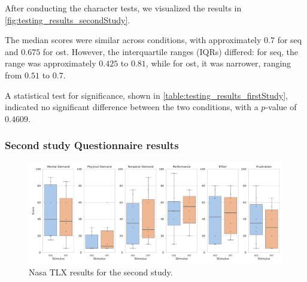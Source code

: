 After conducting the character tests, we visualized the results in \autoref{fig:testing_results_secondStudy}.

The median scores were similar across conditions, with approximately $0.7$ for \gls{seq} and $0.675$ for \gls{ost}. However, the interquartile ranges (IQRs) differed: for \gls{seq}, the range was approximately $0.425$ to $0.81$, while for \gls{ost}, it was narrower, ranging from $0.51$ to $0.7$.

A statistical test for significance, shown in \autoref{table:testing_results_firstStudy}, indicated no significant difference between the two conditions, with a $p$-value of $0.4609$.


\begin{table}[ht]
\caption{Results of the Wilcoxon significance tests during learning with a Cohens D Effect Size.}
\label{table:testing_results_firstStudy}
\end{table}


\subsubsection{Second study Questionnaire results}


\begin{figure}
    \centering
    \includegraphics[width=0.5\linewidth]{src/pictures/Study2Data_questionnaire/NasaTLX.pdf}
    \caption{Nasa TLX results for the second study.}
    \label{fig:nasa_tlx_second_study}
\end{figure}

